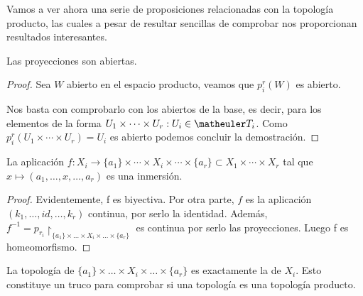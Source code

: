 Vamos a ver ahora una serie de proposiciones relacionadas con la topología producto, las cuales a pesar de resultar sencillas de comprobar nos proporcionan resultados interesantes.

\begin{prop}
	Las proyecciones son abiertas.
	
	\begin{proof}
		Sea $W$ abierto en el espacio producto, veamos que $p_i^r(W)$ es abierto.
		
		Nos basta con comprobarlo con los abiertos de la base, es decir, para los elementos de la forma $ U_1\times\cdots\times U_r : U_i\in \T_i$.  Como  $p_i^r(U_1\times\cdots\times U_r)=U_i$ es abierto podemos concluir la demostración.
	\end{proof}
\end{prop}


\begin{prop}
	La aplicación $f : X_i\to\{a_1\}\times\cdots\times X_i\times\cdots\times \{a_r\}\subset X_1\times\cdots\times X_r$ tal que $x\mapsto (a_1,\dots,x,\dots,a_r)$ es una inmersión.
	
	\begin{proof}
		Evidentemente, f es biyectiva. Por otra parte, $f$ es la aplicación $(k_1,\dots,id,\dots,k_r)$ continua, por serlo la identidad.
		Además, $f^{-1} = p_{r_i}\restriction_{\{a_1\}\times\dots\times X_i \times \dots \times\{a_r\}}$ es continua por serlo las proyecciones. Luego f es homeomorfismo.
	\end{proof}
\end{prop}

\begin{obs}[Consecuencias]
	La topología de $\{a_1\}\times\dots\times X_i \times \dots \times\{a_r\}$ es exactamente la de $X_i$. Esto constituye un truco para comprobar si una topología es una topología producto.
\end{obs}
	

